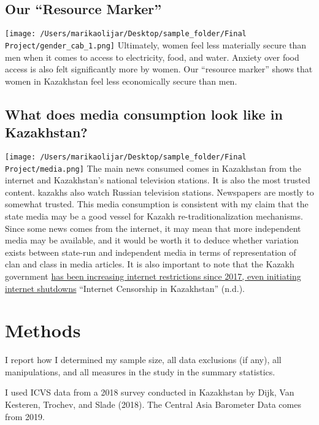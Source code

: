 \documentclass[
  english,
  man]{apa6}
\begin{document}
\hypertarget{our-resource-marker}{%
\subsection{Our ``Resource Marker''}\label{our-resource-marker}}

\texttt{[image: /Users/marikaolijar/Desktop/sample\_folder/Final Project/gender\_cab\_1.png]}
Ultimately, women feel less materially secure than men when it comes to access to electricity, food, and water. Anxiety over food access is also felt significantly more by women. Our ``resource marker'' shows that women in Kazakhstan feel less economically secure than men.

\hypertarget{what-does-media-consumption-look-like-in-kazakhstan}{%
\subsection{What does media consumption look like in Kazakhstan?}\label{what-does-media-consumption-look-like-in-kazakhstan}}

\texttt{[image: /Users/marikaolijar/Desktop/sample\_folder/Final Project/media.png]}
The main news consumed comes in Kazakhstan from the internet and Kazakhstan's national television stations. It is also the most trusted content. kazakhs also watch Russian television stations. Newspapers are mostly to somewhat trusted. This media consumption is consistent with my claim that the state media may be a good vessel for Kazakh re-traditionalization mechanisms. Since some news comes from the internet, it may mean that more independent media may be available, and it would be worth it to deduce whether variation exists between state-run and independent media in terms of representation of clan and class in media articles. It is also important to note that the Kazakh government \href{https://www.opendemocracy.net/en/odr/internet-censorship-in-kazakhstan/}{has been increasing internet restrictions since 2017, even initiating internet shutdowns} {``Internet Censorship in {Kazakhstan}''} (n.d.).

\hypertarget{methods}{%
\section{Methods}\label{methods}}

I report how I determined my sample size, all data exclusions (if any), all manipulations, and all measures in the study in the summary statistics.

I used ICVS data from a 2018 survey conducted in Kazakhstan by Dijk, Van Kesteren, Trochev, and Slade (2018). The Central Asia Barometer Data comes from 2019.
\end{document}
